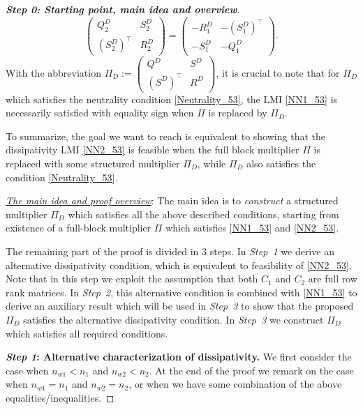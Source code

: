 \documentclass[11pt,a4paper,oneside,DIV=12,headings=small]{scrartcl}
\theoremstyle{plain}
\begin{document}
\begin{proof}[\textbf{Step 0: \emph{Starting point, main idea and overview}}]
\begin{equation}
\label{Neutrality_53}
\begin{pmatrix} Q_2^D & S_2^D \\ (S_2^D)^\top & R_2^D \end{pmatrix}=
\begin{pmatrix} -R_1^D & -(S_1^D)^\top \\ -S_1^D & -Q_1^D \end{pmatrix}.
\end{equation}
With the abbreviation $\Pi_D:=\begin{pmatrix}Q^D & S^D \\ (S^D)^\top & R^D\end{pmatrix}$, it is crucial to note that for $\Pi_D$ which satisfies the neutrality condition \eqref{Neutrality_53}, the LMI \eqref{NN1_53} is necessarily satisfied with equality sign when $\Pi$ is replaced by $\Pi_D$.

To summarize, the goal we want to reach is equivalent to showing that the dissipativity LMI \eqref{NN2_53} is feasible when the full block multiplier $\Pi$ is replaced with some structured multiplier $\Pi_D$, while $\Pi_D$ also satisfies the condition \eqref{Neutrality_53}. 

\emph{\underline{The main idea and proof overview}}: The main idea is to \emph{construct} a structured multiplier $\Pi_D$ which satisfies all the above described conditions, starting from existence of a full-block multiplier $\Pi$ which satisfies \eqref{NN1_53} and \eqref{NN2_53}. 

The remaining part of the proof is divided in 3 steps. In \emph{Step~1} we derive an alternative dissipativity condition, which is equivalent to feasibility of \eqref{NN2_53}. Note that in this step we exploit the assumption that both $C_1$ and $C_2$ are full row rank matrices. In \emph{Step~2}, this alternative condition is combined with \eqref{NN1_53} to derive an auxiliary result which will be used in \emph{Step~3} to show that the proposed $\Pi_D$ satisfies the alternative dissipativity condition. In \emph{Step~3} we construct $\Pi_D$ which satisfies all required conditions.    

\medskip

\textbf{\emph{Step 1}: Alternative characterization of dissipativity.} \newline
We first consider the case when $n_{w1} < n_1$ and $n_{w2} < n_2$. At the end of the proof we remark on the case when $n_{w1}=n_1$ and $n_{w2}=n_2$, or when we have some combination of the above equalities/inequalities. 


\end{proof}
\end{document}
